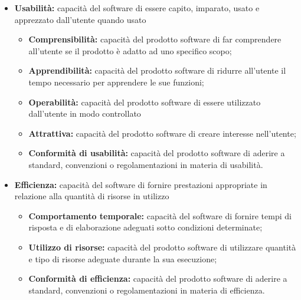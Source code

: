 \documentclass[a4paper]{article}
\begin{document}
\begin{itemize}
					\item \textbf{Usabilità:} capacità del software di essere capito, imparato, usato e apprezzato dall'utente
					quando usato
					\begin{itemize}
						\item \textbf{Comprensibilità:} capacità del prodotto software di far comprendere all'utente se il
						prodotto è adatto ad uno specifico scopo;
						\item \textbf{Apprendibilità:} capacità del prodotto software di ridurre all'utente il tempo necessario
						per apprendere le sue funzioni;
						\item \textbf{Operabilità:} capacità del prodotto software di essere utilizzato dall'utente in modo
						controllato
						\item \textbf{Attrattiva:} capacità del prodotto software di creare interesse nell'utente;
						\item \textbf{Conformità di usabilità:} capacità del prodotto software di aderire a standard, convenzioni
						o regolamentazioni in materia di usabilità.
					\end{itemize}										
					
					\item \textbf{Efficienza:} capacità del software di fornire prestazioni appropriate in relazione alla quantità
					di risorse in utilizzo
					\begin{itemize}
						\item \textbf{Comportamento temporale:} capacità del software di fornire tempi di risposta e di
						elaborazione adeguati sotto condizioni determinate;
						\item \textbf{Utilizzo di risorse:} capacità del prodotto software di utilizzare quantità e tipo di
						risorse adeguate durante la sua esecuzione;
						\item \textbf{Conformità di efficienza:} capacità del prodotto software di aderire a standard,
						convenzioni o regolamentazioni in materia di efficienza.
					\end{itemize}										
					

\end{itemize}
\end{document}
